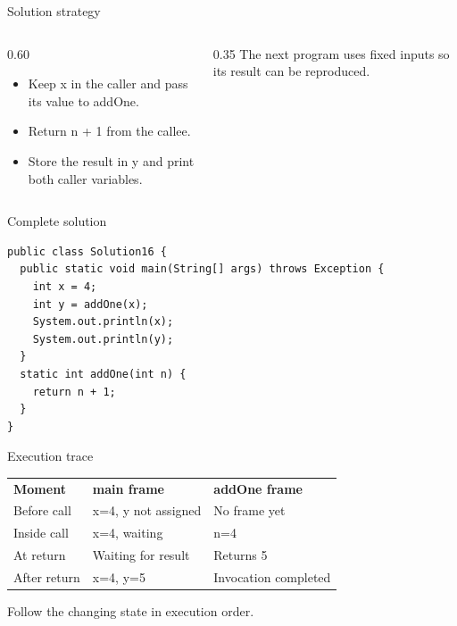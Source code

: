 \documentclass[10pt,aspectratio=169]{beamer}
\begin{document}
\begin{frame}[fragile,t]{Solution strategy}
\begin{columns}[T,onlytextwidth]\begin{column}{0.60\textwidth}
\begin{itemize}
\item Keep x in the caller and pass its value to addOne.
\item Return n + 1 from the callee.
\item Store the result in y and print both caller variables.
\end{itemize}
\end{column}\begin{column}{0.35\textwidth}\small
The next program uses fixed inputs so its result can be reproduced.
\end{column}\end{columns}
\end{frame}

\begin{frame}[fragile,t]{Complete solution}
\begin{lstlisting}
public class Solution16 {
  public static void main(String[] args) throws Exception {
    int x = 4;
    int y = addOne(x);
    System.out.println(x);
    System.out.println(y);
  }
  static int addOne(int n) {
    return n + 1;
  }
}
\end{lstlisting}
\end{frame}

\begin{frame}[fragile,t]{Execution trace}
\small\renewcommand{\arraystretch}{1.5}
\begin{tabularx}{\textwidth}{>{\raggedright\arraybackslash}X>{\raggedright\arraybackslash}X>{\raggedright\arraybackslash}X}
\rowcolor{navy}
\color{white}\bfseries Moment & \color{white}\bfseries main frame & \color{white}\bfseries addOne frame\\
Before call & x=4, y not assigned & No frame yet\\
Inside call & x=4, waiting & n=4\\
At return & Waiting for result & Returns 5\\
After return & x=4, y=5 & Invocation completed\\
\end{tabularx}
\vspace{3mm}\footnotesize Follow the changing state in execution order.
\end{frame}
\end{document}
